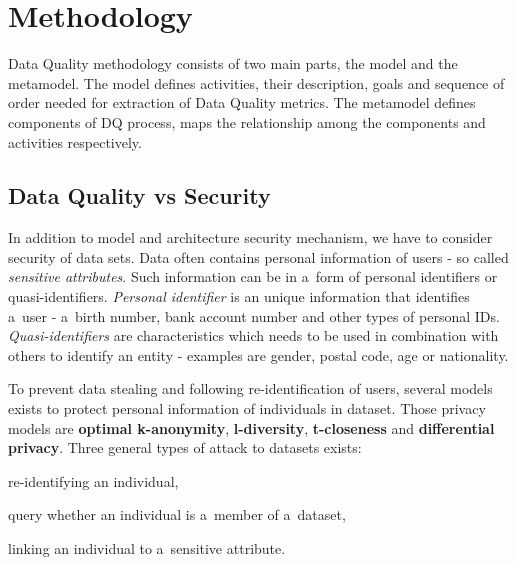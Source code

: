\chapter{Methodology}\label{ch:methodology}

Data Quality methodology consists of two main parts, the model and the metamodel.
The model defines activities, their description, goals and sequence of order needed for extraction of Data Quality metrics.
The metamodel defines components of DQ process, maps the relationship among the components and activities respectively.

\section{Data Quality vs Security}

In addition to model and architecture security mechanism, we have to consider security of data sets.
Data often contains personal information of users - so called \textit{sensitive attributes}.
Such information can be in a~form of personal identifiers or quasi-identifiers.
\textit{Personal identifier} is an unique information that identifies a~user - a~birth number, bank account number and other types of personal IDs.
\textit{Quasi-identifiers} are characteristics which needs to be used in combination with others to identify an entity - examples are gender, postal code, age or nationality.

To prevent data stealing and following re-identification of users, several models exists to protect personal information of individuals in dataset.
Those privacy models are \textbf{optimal k-anonymity}, \textbf{l-diversity}, \textbf{t-closeness} and \textbf{differential privacy}.
Three general types of attack to datasets exists:
\begin{enumerate*}[label=(\roman*)]
    \item \label{itm:reident} re-identifying an individual,
    \item \label{itm:query} query whether an individual is a~member of a~dataset,
    \item \label{itm:linking} linking an individual to a~sensitive attribute.
\end{enumerate*}

